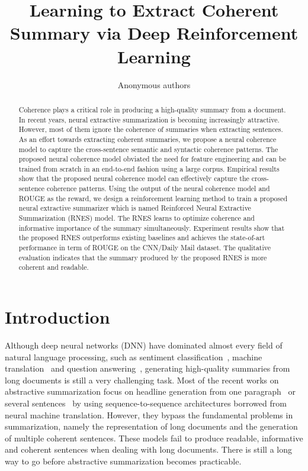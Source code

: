 \documentclass[letterpaper]{article} %
\begin{document}
	\title{Learning to Extract Coherent Summary via Deep Reinforcement Learning}
	\author{Anonymous authors}
	\maketitle
	\begin{abstract}
		 Coherence plays a critical role in producing a high-quality summary from a document. In recent years, neural extractive summarization is becoming increasingly attractive. However, most of them ignore the coherence of summaries when extracting sentences. As an effort towards extracting coherent summaries, we propose a neural coherence model to capture the cross-sentence semantic and syntactic coherence patterns. The proposed neural coherence model obviated the need for feature engineering and can be trained from scratch in an end-to-end fashion using a large corpus. Empirical results show that the proposed neural coherence model can effectively capture the cross-sentence coherence patterns. Using the output of the neural coherence model and ROUGE as the reward, we design a reinforcement learning method to train a proposed neural extractive summarizer which is named Reinforced Neural Extractive Summarization (RNES) model. The RNES learns to optimize coherence and informative importance of the summary simultaneously. Experiment results show that the proposed RNES outperforms existing baselines and achieves the state-of-art performance in term of ROUGE on the CNN/Daily Mail dataset. The qualitative evaluation indicates that the summary produced by the proposed RNES is more coherent and readable.
	\end{abstract}
	
	
	\section{Introduction}
	Although deep neural networks (DNN) have dominated almost every field of natural language processing, such as sentiment classification~\cite{duyutang-sentiment}, machine translation~\cite{cho-translation} and question answering~\cite{xiaoqiang}, generating high-quality summaries from long documents is still a very challenging task. Most of the recent works on abstractive summarization focus on headline generation from one paragraph~\cite{fb2015} or several sentences~\cite{lcsts} by using sequence-to-sequence architectures borrowed from neural machine translation. However, they bypass the fundamental problems in summarization, namely the representation of long documents and the generation of multiple coherent sentences. These models fail to produce readable, informative and coherent sentences when dealing with long documents. There is still a long way to go before abstractive summarization becomes practicable.
	
\end{document}
